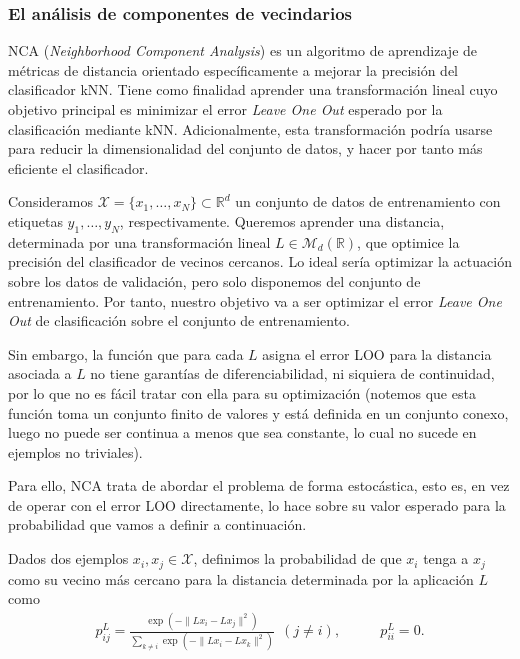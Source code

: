 \subsubsection{El análisis de componentes de vecindarios}

NCA (\emph{Neighborhood Component Analysis}) \cite{nca} es un algoritmo de aprendizaje de métricas de distancia orientado específicamente a mejorar la precisión del clasificador kNN. Tiene como finalidad aprender una transformación lineal cuyo objetivo principal es minimizar el error \emph{Leave One Out} esperado por la clasificación mediante kNN. Adicionalmente, esta transformación podría usarse para reducir la dimensionalidad del conjunto de datos, y hacer por tanto más eficiente el clasificador.
    
Consideramos $\mathcal{X} = \{x_1,\dots,x_N\} \subset \mathbb{R}^d$ un conjunto de datos de entrenamiento con etiquetas $y_1,\dots,y_N$, respectivamente. Queremos aprender una distancia, determinada por una transformación lineal $L \in \mathcal{M}_{d}(\mathbb{R})$, que optimice la precisión del clasificador de vecinos cercanos. Lo ideal sería optimizar la actuación sobre los datos de validación, pero solo disponemos del conjunto de entrenamiento. Por tanto, nuestro objetivo va a ser optimizar el error \emph{Leave One Out} de clasificación sobre el conjunto de entrenamiento.

Sin embargo, la función que para cada $L$ asigna el error LOO para la distancia asociada a $L$ no tiene garantías de diferenciabilidad, ni siquiera de continuidad, por lo que no es fácil tratar con ella para su optimización (notemos que esta función toma un conjunto finito de valores y está definida en un conjunto conexo, luego no puede ser continua a menos que sea constante, lo cual no sucede en ejemplos no triviales).

Para ello, NCA trata de abordar el problema de forma estocástica, esto es, en vez de operar con el error LOO directamente, lo hace sobre su valor esperado para la probabilidad que vamos a definir a continuación.

Dados dos ejemplos $x_i, x_j \in \mathcal{X}$, definimos la probabilidad de que $x_i$ tenga a $x_j$ como su vecino más cercano para la distancia determinada por la aplicación $L$ como
\begin{equation}
    \begin{split}
    p_{ij}^L = \frac{\exp\left( - \|Lx_i - Lx_j \|^2 \right)}{\sum\limits_{k \ne i} \exp\left(-\|Lx_i - Lx_k \|^2\right)}\ \ (j \ne i),  
    \end{split}
    \quad\quad
    \begin{split}
    p_{ii}^L = 0.
    \end{split}
\end{equation}

